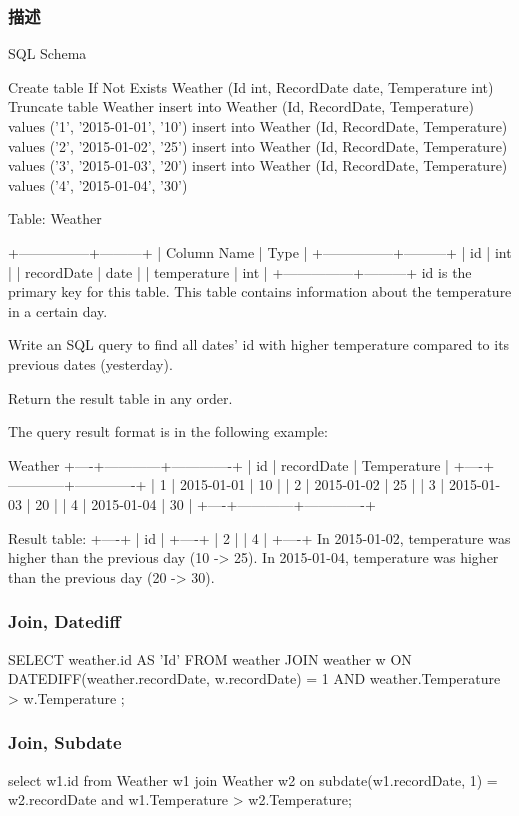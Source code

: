 \subsubsection{描述}
SQL Schema

\begin{Code}
Create table If Not Exists Weather (Id int, RecordDate date, Temperature int)
Truncate table Weather
insert into Weather (Id, RecordDate, Temperature) values ('1', '2015-01-01', '10')
insert into Weather (Id, RecordDate, Temperature) values ('2', '2015-01-02', '25')
insert into Weather (Id, RecordDate, Temperature) values ('3', '2015-01-03', '20')
insert into Weather (Id, RecordDate, Temperature) values ('4', '2015-01-04', '30')
\end{Code}

Table: Weather

\begin{Code}
+---------------+---------+
| Column Name   | Type    |
+---------------+---------+
| id            | int     |
| recordDate    | date    |
| temperature   | int     |
+---------------+---------+
id is the primary key for this table.
This table contains information about the temperature in a certain day.
\end{Code}

Write an SQL query to find all dates' id with higher temperature compared to its previous dates (yesterday).

Return the result table in any order.

The query result format is in the following example:
\begin{Code}
Weather
+----+------------+-------------+
| id | recordDate | Temperature |
+----+------------+-------------+
| 1  | 2015-01-01 | 10          |
| 2  | 2015-01-02 | 25          |
| 3  | 2015-01-03 | 20          |
| 4  | 2015-01-04 | 30          |
+----+------------+-------------+

Result table:
+----+
| id |
+----+
| 2  |
| 4  |
+----+
In 2015-01-02, temperature was higher than the previous day (10 -> 25).
In 2015-01-04, temperature was higher than the previous day (20 -> 30).
\end{Code}


\subsubsection{Join, Datediff}
\begin{Code}
SELECT
    weather.id AS 'Id'
FROM
    weather
        JOIN
    weather w ON DATEDIFF(weather.recordDate, w.recordDate) = 1
        AND weather.Temperature > w.Temperature
;
\end{Code}

\subsubsection{Join, Subdate}
\begin{Code}
select
    w1.id
from
    Weather w1
join
    Weather w2
on
    subdate(w1.recordDate, 1) = w2.recordDate
    and w1.Temperature > w2.Temperature;
\end{Code}
